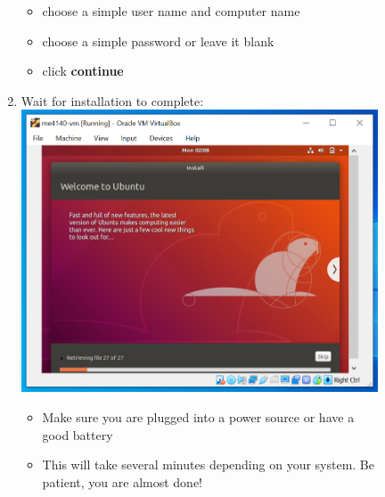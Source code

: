 \documentclass[12pt]{article}
\begin{document}
\begin{description}
\begin{description}
\begin{enumerate}[label=\alph*)]
\begin{itemize}
				 \item choose a simple user name and computer name
				 \item choose a simple password or leave it blank
				 \item click {\bf continue}
                     
            \end{itemize}
\newpage
\item Wait for installation to complete: \vspace{5mm} \\
      		\hspace*{-2.5cm}\includegraphics[scale=.6]{Capture20.png}
            \begin{itemize}
            \item  Make sure you are plugged into a power source or have a good battery
        \item  This will take several minutes depending on your system. Be patient, you are almost done! \vspace{5mm} \\
    \end{itemize} 


\end{enumerate}
\end{description}
\end{description}
\end{document}
